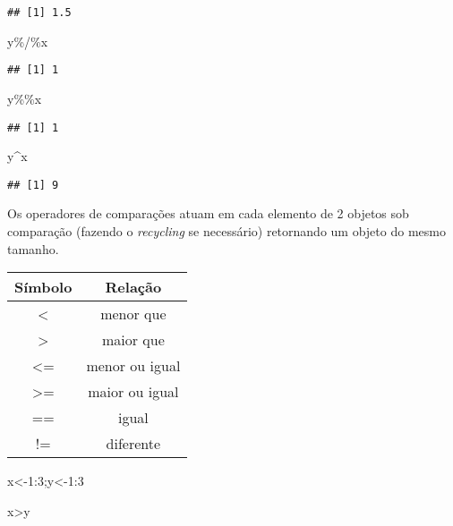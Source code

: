 \documentclass[
]{book}
\newenvironment{Shaded}{\begin{snugshade}}{\end{snugshade}}
\newcommand{\DecValTok}[1]{\textcolor[rgb]{0.00,0.00,0.81}{#1}}
\newcommand{\NormalTok}[1]{#1}
\newcommand{\OtherTok}[1]{\textcolor[rgb]{0.56,0.35,0.01}{#1}}
\newcommand{\SpecialCharTok}[1]{\textcolor[rgb]{0.00,0.00,0.00}{#1}}
\begin{document}
\begin{verbatim}
## [1] 1.5
\end{verbatim}

\begin{Shaded}
\begin{Highlighting}[]
\NormalTok{y}\SpecialCharTok{\%/\%}\NormalTok{x}
\end{Highlighting}
\end{Shaded}

\begin{verbatim}
## [1] 1
\end{verbatim}

\begin{Shaded}
\begin{Highlighting}[]
\NormalTok{y}\SpecialCharTok{\%\%}\NormalTok{x}
\end{Highlighting}
\end{Shaded}

\begin{verbatim}
## [1] 1
\end{verbatim}

\begin{Shaded}
\begin{Highlighting}[]
\NormalTok{y}\SpecialCharTok{\^{}}\NormalTok{x}
\end{Highlighting}
\end{Shaded}

\begin{verbatim}
## [1] 9
\end{verbatim}

Os operadores de comparações atuam em cada elemento de 2 objetos sob comparação (fazendo o \emph{recycling} se necessário) retornando um objeto do mesmo tamanho.

\begin{longtable}[]{@{}cc@{}}
\toprule
Símbolo & Relação \\
\midrule
\endhead
\textless{} & menor que \\
\textgreater{} & maior que \\
\textless= & menor ou igual \\
\textgreater= & maior ou igual \\
== & igual \\
!= & diferente \\
\bottomrule
\end{longtable}

\begin{Shaded}
\begin{Highlighting}[]
\NormalTok{x}\OtherTok{\textless{}{-}}\DecValTok{1}\SpecialCharTok{:}\DecValTok{3}\NormalTok{;y}\OtherTok{\textless{}{-}}\DecValTok{1}\SpecialCharTok{:}\DecValTok{3}

\NormalTok{x}\SpecialCharTok{\textgreater{}}\NormalTok{y}
\end{Highlighting}
\end{Shaded}
\end{document}

